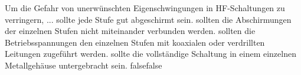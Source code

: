     {Um die Gefahr von unerwünschten Eigenschwingungen in HF-Schaltungen zu verringern, ...}
    {sollte jede Stufe gut abgeschirmt sein.}
    {sollten die Abschirmungen der einzelnen Stufen nicht miteinander verbunden werden.}
    {sollten die Betriebsspannungen den einzelnen Stufen mit koaxialen oder verdrillten Leitungen zugeführt werden.}
    {sollte die vollständige Schaltung in einem einzelnen Metallgehäuse untergebracht sein.}
    {false}{false}